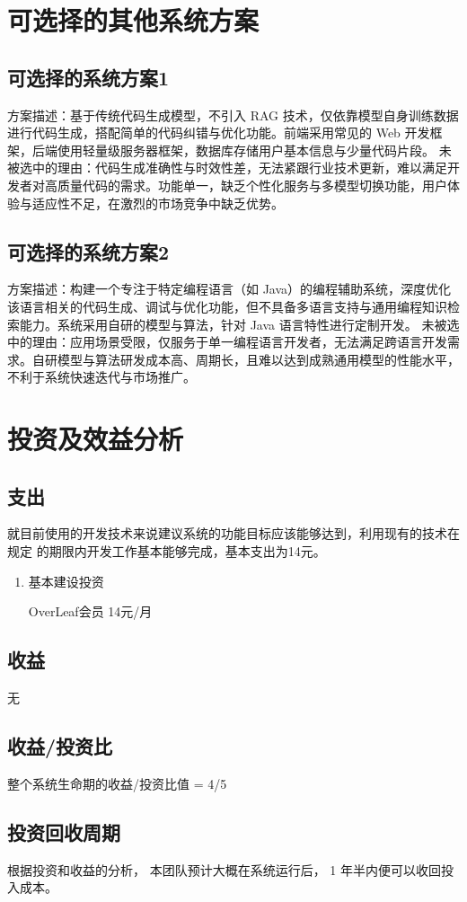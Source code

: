 \documentclass[
    report,     %
    oneside,    %
    UTF8,       %
    zihao=-4    %
]{config} %
\begin{document}
\section{可选择的其他系统方案}
\subsection{可选择的系统方案1}
方案描述：基于传统代码生成模型，不引入 RAG 技术，仅依靠模型自身训练数据进行代码生成，搭配简单的代码纠错与优化功能。前端采用常见的 Web 开发框架，后端使用轻量级服务器框架，数据库存储用户基本信息与少量代码片段。
未被选中的理由：代码生成准确性与时效性差，无法紧跟行业技术更新，难以满足开发者对高质量代码的需求。功能单一，缺乏个性化服务与多模型切换功能，用户体验与适应性不足，在激烈的市场竞争中缺乏优势。
\subsection{可选择的系统方案2}
方案描述：构建一个专注于特定编程语言（如 Java）的编程辅助系统，深度优化该语言相关的代码生成、调试与优化功能，但不具备多语言支持与通用编程知识检索能力。系统采用自研的模型与算法，针对 Java 语言特性进行定制开发。
未被选中的理由：应用场景受限，仅服务于单一编程语言开发者，无法满足跨语言开发需求。自研模型与算法研发成本高、周期长，且难以达到成熟通用模型的性能水平，不利于系统快速迭代与市场推广。
\section{投资及效益分析}
\subsection{支出}
就目前使用的开发技术来说建议系统的功能目标应该能够达到，利用现有的技术在规定
的期限内开发工作基本能够完成，基本支出为14元。
\begin{enumerate}[label=(\arabic*)]
    \item 基本建设投资
    
    OverLeaf会员 14元/月
\end{enumerate}
\subsection{收益}
无
\subsection{收益/投资比}
整个系统生命期的收益/投资比值 = 4/5
\subsection{投资回收周期}
根据投资和收益的分析， 本团队预计大概在系统运行后， 1 年半内便可以收回投入成本。
\end{document}
